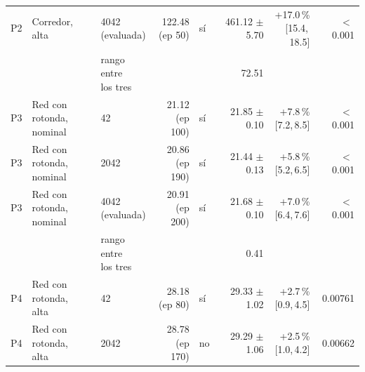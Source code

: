 \begin{table}[H]
\begin{tabular}{lllrlrrr}
P2 & \makecell[l]{Corredor,\\{}alta} & \makecell[l]{4042\\{}(evaluada)} & \makecell[r]{122.48\\{}(ep 50)} & sí & \makecell[r]{461.12\\{}$\pm$ 5.70} & \makecell[r]{+17.0\,\%\\{}[15.4,\,18.5]} & $<$\,0.001 \\
 & & \makecell[l]{rango entre\\{}los tres} & & & 72.51 & & \\
P3 & \makecell[l]{Red con rotonda,\\{}nominal} & 42 & \makecell[r]{21.12\\{}(ep 100)} & sí & \makecell[r]{21.85\\{}$\pm$ 0.10} & \makecell[r]{+7.8\,\%\\{}[7.2,\,8.5]} & $<$\,0.001 \\
P3 & \makecell[l]{Red con rotonda,\\{}nominal} & 2042 & \makecell[r]{20.86\\{}(ep 190)} & sí & \makecell[r]{21.44\\{}$\pm$ 0.13} & \makecell[r]{+5.8\,\%\\{}[5.2,\,6.5]} & $<$\,0.001 \\
P3 & \makecell[l]{Red con rotonda,\\{}nominal} & \makecell[l]{4042\\{}(evaluada)} & \makecell[r]{20.91\\{}(ep 200)} & sí & \makecell[r]{21.68\\{}$\pm$ 0.10} & \makecell[r]{+7.0\,\%\\{}[6.4,\,7.6]} & $<$\,0.001 \\
 & & \makecell[l]{rango entre\\{}los tres} & & & 0.41 & & \\
P4 & \makecell[l]{Red con rotonda,\\{}alta} & 42 & \makecell[r]{28.18\\{}(ep 80)} & sí & \makecell[r]{29.33\\{}$\pm$ 1.02} & \makecell[r]{+2.7\,\%\\{}[0.9,\,4.5]} & 0.00761 \\
P4 & \makecell[l]{Red con rotonda,\\{}alta} & 2042 & \makecell[r]{28.78\\{}(ep 170)} & no & \makecell[r]{29.29\\{}$\pm$ 1.06} & \makecell[r]{+2.5\,\%\\{}[1.0,\,4.2]} & 0.00662 \\

\end{tabular}
\end{table}
